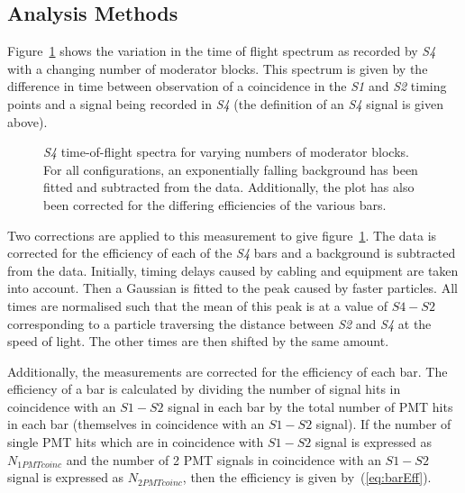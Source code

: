 \subsection{Analysis Methods}

Figure~\ref{fig:s4tof} shows the variation in the time of flight spectrum as recorded by \textit{S4} with a changing number of moderator blocks.
This spectrum is given by the difference in time between observation of a coincidence in the \textit{S1} and \textit{S2} timing points and a signal being recorded in \textit{S4} (the definition of an \textit{S4} signal is given above).

\begin{figure}[h]
  \begin{adjustbox}{max totalsize={.8\textwidth}{.5\textheight},center}
    
  \end{adjustbox}
  \caption{\textit{S4} time-of-flight spectra for varying numbers of moderator blocks. For all configurations, an exponentially falling background has been fitted and subtracted from the data. Additionally, the plot has also been corrected for the differing efficiencies of the various bars.}
  \label{fig:s4tof}	
\end{figure}

Two corrections are applied to this measurement to give figure~\ref{fig:s4tof}. 
The data is corrected for the efficiency of each of the \textit{S4} bars and a background is subtracted from the data.
Initially, timing delays caused by cabling and equipment are taken into account.
Then a Gaussian is fitted to the peak caused by faster particles.
All times are normalised such that the mean of this peak is at a value of $\mathit{S4} - \mathit{S2}$ corresponding to a particle traversing the distance between \textit{S2} and \textit{S4} at the speed of light. 
The other times are then shifted by the same amount.

Additionally, the measurements are corrected for the efficiency of each bar. 
The efficiency of a bar is calculated by dividing the number of signal hits in coincidence with an $\mathit{S1}-\mathit{S2}$ signal in each bar by the total number of PMT hits in each bar (themselves in coincidence with an $\mathit{S1}-\mathit{S2}$ signal). 
If the number of single PMT hits which are in coincidence with $\mathit{S1}-\mathit{S2}$ signal is expressed as $N_{1PMTcoinc}$ and the number of 2 PMT signals in coincidence with an $\mathit{S1}-\mathit{S2}$ signal is expressed as $N_{2PMTcoinc}$, then the efficiency is given by~(\ref{eq:barEff}).

